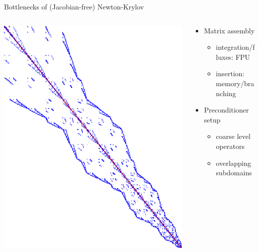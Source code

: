 \begin{frame}{Bottlenecks of (Jacobian-free) Newton-Krylov}
  \begin{columns}
    \begin{column}{0.4\textwidth}
      \includegraphics[width=1.15\textwidth]{figures/Dohp/EllipRCM}
    \end{column}
    \begin{column}{0.6\textwidth}
      \begin{itemize}
      \item Matrix assembly
        \begin{itemize}
        \item integration/fluxes: FPU
        \item insertion: memory/branching
        \end{itemize}
      \item Preconditioner setup
        \begin{itemize}
        \item coarse level operators
        \item overlapping subdomains

\end{itemize}
\end{itemize}
\end{column}
\end{columns}
\end{frame}
